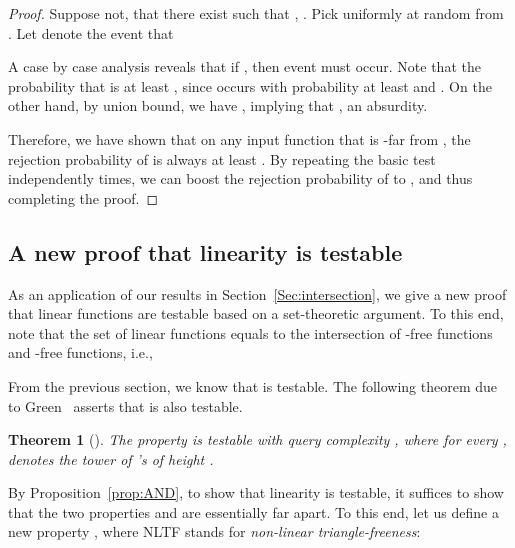 \documentclass[11pt,english]{article}
\newtheorem{theorem}{Theorem}
\theoremstyle{definition}
\theoremstyle{remark}
\begin{document}
\begin{proof}
Suppose not, that there exist  such that , .
Pick  uniformly at random from .
Let  denote the event that 

A case by case analysis reveals that if , then event  must occur. 
Note that the probability that  is at least ,
since  occurs with probability at least  and .
On the other hand, by union bound, we have , 
implying that 
, an absurdity.

Therefore, we have shown that on any input function that is -far from ,
the rejection probability of  is always at least . 
By repeating the basic test  independently  times, 
we can boost the rejection probability of  to , and thus completing the proof. 
\end{proof}

\subsection{A new proof that linearity is testable}
\label{Sec:linearity} 

As an application of our results in Section~\ref{Sec:intersection},
we give a new proof that linear functions are testable based on a
set-theoretic argument. 
To this end, note that the set of linear functions equals to the intersection of -free
functions and -free functions, i.e., 

From the previous section, we know that  is testable. The following
theorem due to Green~\cite{Gre05} asserts that  is also testable.

\begin{theorem}[\cite{Gre05}]\label{thm:Green} 
The property  is testable with query complexity ,
where for every ,  denotes the tower of 's of height
.\end{theorem}
By Proposition~\ref{prop:AND}, to show that linearity is testable,
it suffices to show that the two properties  and  are
essentially far apart. 
To this end, let us define a new property , 
where NLTF stands for \emph{non-linear triangle-freeness}:
\end{document}
